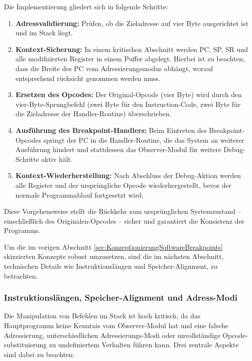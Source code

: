 Die Implementierung gliedert sich in folgende Schritte:
\begin{enumerate}
	\item \textbf{Adressvalidierung:} Pr\"ufen, ob die Zieladresse auf vier Byte ausgerichtet ist und im Stack liegt.
	  
	\item \textbf{Kontext-Sicherung:} In einem kritischen Abschnitt werden PC, SP, SR und alle modifizierten Register in einem Puffer abgelegt. Hierbei ist zu beachten, dass die Breite des PC vom Adressierungsmodus abh\"angt, worauf entsprechend r\"ucksicht genommen werden muss. 
	
	\item \textbf{Ersetzen des Opcodes:} Der Original-Opcode (vier Byte) wird durch den vier-Byte-Sprungbefehl (zwei Byte f\"ur den Instruction-Code, zwei Byte f\"ur die Zieladresse der Handler-Routine) \"uberschrieben. 
	
	\item \textbf{Ausf\"uhrung des Breakpoint-Handlers:} Beim Eintreten des Breakpoint-Opcodes springt der PC in die Handler-Routine, die das System an weiterer Ausf\"uhrung hindert und stattdessen das Observer-Modul f\"ur weitere Debug-Schritte aktiv h\"alt.
	
	\item \textbf{Kontext-Wiederherstellung:} Nach Abschluss der Debug-Aktion werden alle Register und der urspr\"ungliche Opcode wiederhergestellt, bevor der normale Programmablauf fortgesetzt wird.
\end{enumerate}

Diese Vorgehensweise stellt die R\"uckkehr zum urspr\"unglichen Systemzustand – einschlie{\ss}lich des Originalen-Opcodes – sicher und garantiert die Konsistenz des Programms.

Um die im vorigen Abschnitt \ref{sec:KonzeptionierungSoftwareBreakpoints} skizzierten Konzepte robust umzusetzen, sind die im n\"achsten Abschnitt, technischen Details wie Instruktionsl\"angen und Speicher-Alignment, zu betrachten.\AI



\newpage
\subsubsection{Instruktionsl\"angen, Speicher-Alignment und Adress-Modi}
\label{sec:TechnischeUmsetzunSoftwareBreakpoints}

Die Manipulation von Befehlen im Stack ist hoch kritisch, da das Hauptprogramm keine Kenntnis vom Observer-Modul hat und eine falsche Adressierung, unterschiedlichen Adressierungs-Modi oder unvollst\"andige Opcode-substituierung zu undefiniertem Verhalten f\"uhren kann. Drei zentrale Aspekte sind dabei zu beachten:

